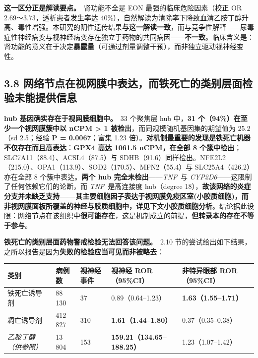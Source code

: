 \documentclass[UTF8,fontset=windows,11pt]{ctexart}
\begin{document}
\textbf{这一区分正是解读要点。}\ 肾功能不全是 EON 最强的临床危险因素（校正 OR 2.69～3.73，透析患者发生率达 40\%），自然解读为清除率下降致血清乙胺丁醇升高、毒性增强。本研究的阴性遗传结果\textbf{与这一解读一致}，而与竞争性解释——尿毒症性神经病变与视神经病变存在独立于药物的共同病因——\textbf{不一致}。临床含义是：肾功能的意义在于决定\textbf{暴露量}（可通过剂量调整干预），而非独立驱动视神经变性。

\subsection{3.8 网络节点在视网膜中表达，而铁死亡的类别层面检验未能提供信息}

\textbf{hub 基因确实存在于视网膜细胞中。}\ 33 个聚焦层 hub 中，\textbf{31 个（94\%）在至少一个视网膜簇中以 nCPM > 1 被检出}，而同规模随机基因集的期望值为 25.2（sd 2.5；经验 \textbf{P = 0.0067}；富集 1.23 倍）。\textbf{对机制最重要的发现是铁死亡机器不仅存在而且高表达}：\textbf{GPX4 高达 1061.5 nCPM，在全部 8 个簇中检出}；SLC7A11（88.4）、ACSL4（87.5）与 SDHB（91.6）同样检出。NFE2L2（215.0）、OPA1（113.9）、SOD2（170.5）、MFN2（55.4）与 SLC25A4（426.2）亦在全部 8 个簇中表达。\textbf{两个 hub 完全未检出}——\textit{TNF}\ 与 \textit{CYP2D6}——这限制了任何依赖它们的论断，而 \textit{TNF}\ 是高连接度 hub（degree 18），\textbf{故该网络的炎症分支并未缺乏支持——其主要细胞因子表达于视网膜免疫区室(小胶质细胞)，而非视网膜面板所覆盖的神经与胶质细胞中，详见下文小胶质细胞分析}。结论据此设限：网络节点在该组织中\textbf{很可能存在}，这是机制成立的前提，\textbf{但转录本的存在不等于参与}。

\textbf{铁死亡的类别层面药物警戒检验无法回答该问题。}\ 2.10 节的尝试给出如下结果，之所以报告是因为\textbf{失败的检验应当可见而非被略去}：

\begin{center}
\small
\begin{longtable}{p{}p{}p{}p{}p{}}
\hline
类别 & 病例数 & 视神经事件 & 视神经 ROR（95\%CI） & 非特异眼部 ROR（95\%CI） \\
\hline
铁死亡诱导剂 & 88 130 & 37 & 0.89（0.64–1.23） & \textbf{1.63（1.55–1.71）} \\
凋亡诱导剂 & 412 827 & 310 & \textbf{1.61（1.44–1.80）} & 0.37（0.35–0.38） \\
\textit{乙胺丁醇（供参照）} & 13 804 & 153 & \textbf{159.21（134.65–188.25）} & 1.23（1.07–1.42） \\
\hline
\end{longtable}
\end{center}
\end{document}
